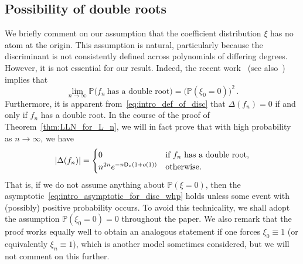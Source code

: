 \documentclass[11pt]{amsart}
\theoremstyle{remark}
\theoremstyle{definition}
\newcommand{\bP}{\mathbb P}
\newcommand{\disc}{\Delta}
\begin{document}
    \subsection{Possibility of double roots}
    \label{subsection:possible_double_roots}
    We briefly comment on our assumption that the coefficient distribution $\xi$ has no atom at the origin. This assumption is natural, particularly because the discriminant is not consistently defined across polynomials of differing degrees. However, it is not essential for our result.   
    Indeed, the recent work~\cite[Corollary~1.2]{Michelen-Yakir-root-separation} (see also~\cite[Theorem~1.3]{Michelen-Yakir-root-separation}) implies that 
    \[
        \lim_{n\to\infty} \bP\big(f_n \ \text{has a double root}\big) = \big(\bP(\xi_0 = 0)\big)^2 \, .
    \]
    Furthermore, it is apparent from~\eqref{eq:intro_def_of_disc} that $\disc(f_n) = 0$ if and only if $f_n$ has a double root. In the course of the proof of Theorem~\ref{thm:LLN_for_L_n}, we will in fact prove that with high probability as $n\to \infty$, we have
        \[
        |\disc(f_n)| = \begin{cases}
            0  & \text{if $f_n$ has a double root,} \\ n^{2n} e^{-n{\sf D}_{\ast}(1+ o(1))} & \text{otherwise.} 
        \end{cases}
        \]
    That is, if we do not assume anything about $\bP(\xi=0)$, then the asymptotic~\eqref{eq:intro_asymptotic_for_disc_whp} holds unless some event with (possibly) positive probability occurs. To avoid this technicality, we shall adopt the assumption $\bP(\xi_0=0) = 0$ throughout the paper. We also remark that the proof works equally well to obtain an analogous statement if one forces $\xi_0 \equiv 1$ (or equivalently $\xi_n \equiv 1$), which is another model sometimes considered, but we will not comment on this further.
    
\end{document}
